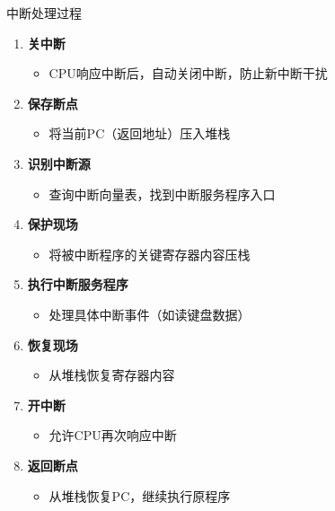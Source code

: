 \documentclass[10pt, aspectratio=169]{beamer}
\begin{document}
\begin{frame}{中断处理过程}
    \begin{enumerate}
        \item \textbf{关中断}
            \begin{itemize}
                \item CPU响应中断后，自动关闭中断，防止新中断干扰
            \end{itemize}
        \item \textbf{保存断点}
            \begin{itemize}
                \item 将当前PC（返回地址）压入堆栈
            \end{itemize}
        \item \textbf{识别中断源}
            \begin{itemize}
                \item 查询中断向量表，找到中断服务程序入口
            \end{itemize}
        \item \textbf{保护现场}
            \begin{itemize}
                \item 将被中断程序的关键寄存器内容压栈
            \end{itemize}
        \item \textbf{执行中断服务程序}
            \begin{itemize}
                \item 处理具体中断事件（如读键盘数据）
            \end{itemize}
        \item \textbf{恢复现场}
            \begin{itemize}
                \item 从堆栈恢复寄存器内容
            \end{itemize}
        \item \textbf{开中断}
            \begin{itemize}
                \item 允许CPU再次响应中断
            \end{itemize}
        \item \textbf{返回断点}
            \begin{itemize}
                \item 从堆栈恢复PC，继续执行原程序
            \end{itemize}
    \end{enumerate}
\end{frame}
\end{document}
